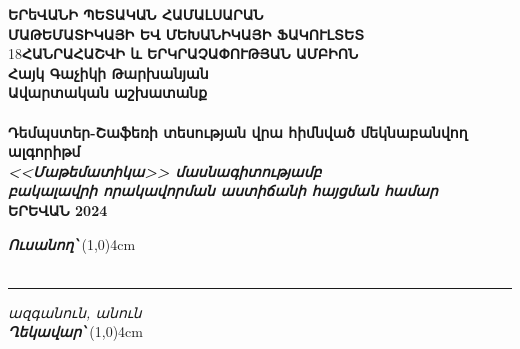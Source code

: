\documentclass[12pt,a4paper]{article}
\begin{document}
\setcounter{page}{1}
\begin{titlepage}
	\begin{center}
		{\fontsize{18}{18}\selectfont\textbf{\textarmenian{ԵՐեՎԱՆԻ ՊԵՏԱԿԱՆ ՀԱՄԱԼՍԱՐԱՆ}}}\\ 
		[0.7cm]
		{\fontsize{18}{18}\selectfont\textbf{\textarmenian{ՄԱԹԵՄԱՏԻԿԱՅԻ ԵՎ ՄԵԽԱՆԻԿԱՅԻ ՖԱԿՈՒԼՏԵՏ}}}\\
		[0.7cm]
		{\fontsize{18} {18}\selectfont\textbf{\textarmenian{ՀԱՆՐԱՀԱՇՎԻ և ԵՐԿՐԱՉԱՓՈՒԹՅԱՆ ԱՄԲԻՈՆ}}}\\
		[2cm]
		
		{\fontsize{18}{18}\selectfont\textbf{\textarmenian{Հայկ Գաչիկի Թարխանյան}}}\\
		[2cm]
		
		{\fontsize{25}{25}\selectfont\textbf{\textarmenian{Ավարտական աշխատանք}}}\\
		[3cm]
		\\
		{\fontsize{16}{16}\selectfont\textbf{\textarmenian{Դեմպստեր-Շաֆեռի տեսության վրա հիմնված մեկնաբանվող ալգորիթմ}}}\\
		\vfill
		{\fontsize{16}{16}\textit{\textbf{\textarmenian{<<Մաթեմատիկա>> մասնագիտությամբ \\ բակալավրի որակավորման աստիճանի հայցման համար}}}}\\
		[2cm]
		
		{\fontsize{13}{13}\textbf{\textarmenian{ԵՐԵՎԱՆ 2024}}}
		
	\end{center}
	
	\newpage
	
	
	{\fontsize{13}{13}\textbf{\textit{\textarmenian{Ուսանող՝}}}} \line(1,0){4cm}\\
	\\

	
	\vspace{20pt}
		\hrule
	\vspace{5pt}
	
	{\scriptsize \textit{\textarmenian{ազգանուն, անուն}}}\\
	[4cm]
	
	{\fontsize{13}{13}\textbf{\textit{\textarmenian{Ղեկավար՝}}}} \line(1,0){4cm}\\
	\\
	

\end{titlepage}
\end{document}
